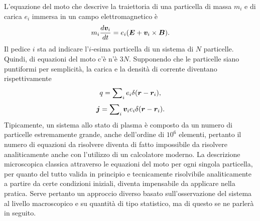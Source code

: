 L'equazione del moto che descrive la traiettoria di una particella di massa $m_i$ e di carica $e_i$ immersa in un campo elettromagnetico è 
\begin{equation}
\label{eq: equazione del moto i-esima particella in un campo EM}
    m_i\frac{d\bm{v}_i}{dt} = e_i(\bm{E} + \bm{v}_i \times \bm{B}).
\end{equation}
Il pedice $i$ sta ad indicare l'$i$-esima particella di un sistema di $N$ particelle. Quindi, di equazioni del moto c'è n'è $3N$. Supponendo che le particelle siano puntiformi per semplicità, la carica e la densità di corrente diventano rispettivamente
\begin{equation}
    q = \sum\nolimits_ie_i\delta(\bm{r} - \bm{r}_i),
\end{equation}
\begin{equation}
    \bm{j} = \sum\nolimits_i\bm{v}_ie_i\delta(\bm{r} - \bm{r}_i).
\end{equation}
Tipicamente, un sistema allo stato di plasma è composto da un numero di particelle estremamente grande, anche dell'ordine di $10^6$ elementi, pertanto il numero di equazioni da risolvere diventa di fatto impossibile da risolvere analiticamente anche con l'utilizzo di un calcolatore moderno. La descrizione microscopica classica attraverso le equazioni del moto per ogni singola particella, per quanto del tutto valida in principio e tecnicamente risolvibile analiticamente a partire da certe condizioni iniziali, diventa impensabile da applicare nella pratica. Serve pertanto un approccio diverso basato sull'osservazione del sistema al livello macroscopico e su quantità di tipo statistico, ma di questo se ne parlerà in seguito.

